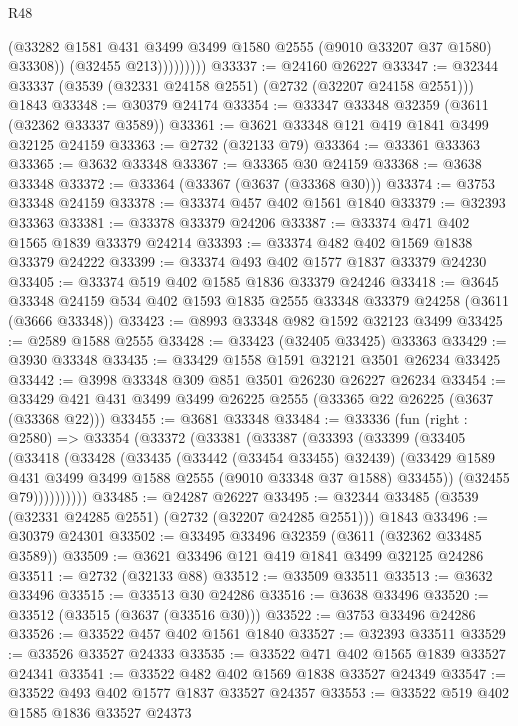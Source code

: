 \begin{lexlean}{R48}
\begin{coremodule}
                      (@33282 @1581 @431 @3499 @3499 @1580 @2555 (@9010 @33207 @37 @1580) @33308))
                    (@32455 @213)))))))))
@33337 := @24160 @26227
@33347 := @32344 @33337 (@3539 (@32331 @24158 @2551) (@2732 (@32207 @24158 @2551))) @1843
@33348 := @30379 @24174
@33354 := @33347 @33348 @32359 (@3611 (@32362 @33337 @3589))
@33361 := @3621 @33348 @121 @419 @1841 @3499 @32125 @24159
@33363 := @2732 (@32133 @79)
@33364 := @33361 @33363
@33365 := @3632 @33348
@33367 := @33365 @30 @24159
@33368 := @3638 @33348
@33372 := @33364 (@33367 (@3637 (@33368 @30)))
@33374 := @3753 @33348 @24159
@33378 := @33374 @457 @402 @1561 @1840
@33379 := @32393 @33363
@33381 := @33378 @33379 @24206
@33387 := @33374 @471 @402 @1565 @1839 @33379 @24214
@33393 := @33374 @482 @402 @1569 @1838 @33379 @24222
@33399 := @33374 @493 @402 @1577 @1837 @33379 @24230
@33405 := @33374 @519 @402 @1585 @1836 @33379 @24246
@33418 := @3645
    @33348
    @24159
    @534
    @402
    @1593
    @1835
    @2555
    @33348
    @33379
    @24258
    (@3611 (@3666 @33348))
@33423 := @8993 @33348 @982 @1592 @32123 @3499
@33425 := @2589 @1588 @2555
@33428 := @33423 (@32405 @33425) @33363
@33429 := @3930 @33348
@33435 := @33429 @1558 @1591 @32121 @3501 @26234 @33425
@33442 := @3998 @33348 @309 @851 @3501 @26230 @26227 @26234
@33454 := @33429 @421 @431 @3499 @3499 @26225 @2555 (@33365 @22 @26225 (@3637 (@33368 @22)))
@33455 := @3681 @33348
@33484 := @33336
    (fun (right : @2580) =>
    @33354
      (@33372
        (@33381
          (@33387
            (@33393
              (@33399
                (@33405
                  (@33418
                    (@33428
                      (@33435
                        (@33442 (@33454 @33455) @32439)
                        (@33429 @1589 @431 @3499 @3499 @1588 @2555 (@9010 @33348 @37 @1588) @33455))
                      (@32455 @79))))))))))
@33485 := @24287 @26227
@33495 := @32344 @33485 (@3539 (@32331 @24285 @2551) (@2732 (@32207 @24285 @2551))) @1843
@33496 := @30379 @24301
@33502 := @33495 @33496 @32359 (@3611 (@32362 @33485 @3589))
@33509 := @3621 @33496 @121 @419 @1841 @3499 @32125 @24286
@33511 := @2732 (@32133 @88)
@33512 := @33509 @33511
@33513 := @3632 @33496
@33515 := @33513 @30 @24286
@33516 := @3638 @33496
@33520 := @33512 (@33515 (@3637 (@33516 @30)))
@33522 := @3753 @33496 @24286
@33526 := @33522 @457 @402 @1561 @1840
@33527 := @32393 @33511
@33529 := @33526 @33527 @24333
@33535 := @33522 @471 @402 @1565 @1839 @33527 @24341
@33541 := @33522 @482 @402 @1569 @1838 @33527 @24349
@33547 := @33522 @493 @402 @1577 @1837 @33527 @24357
@33553 := @33522 @519 @402 @1585 @1836 @33527 @24373

\end{coremodule}
\end{lexlean}
